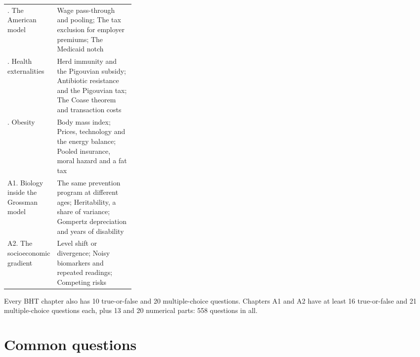\begin{center}
\begin{tabularx}{\linewidth}{@{}>{\raggedright\arraybackslash}p{0.30\linewidth} >{\raggedright\arraybackslash}X@{}}
\addlinespace
18. The American model & Wage pass-through and pooling; The tax exclusion for employer premiums; The Medicaid notch \\
\addlinespace
20. Health externalities & Herd immunity and the Pigouvian subsidy; Antibiotic resistance and the Pigouvian tax; The Coase theorem and transaction costs \\
\addlinespace
22. Obesity & Body mass index; Prices, technology and the energy balance; Pooled insurance, moral hazard and a fat tax \\
\addlinespace
A1. Biology inside the Grossman model & The same prevention program at different ages; Heritability, a share of variance; Gompertz depreciation and years of disability \\
\addlinespace
A2. The socioeconomic gradient & Level shift or divergence; Noisy biomarkers and repeated readings; Competing risks \\
\bottomrule
\end{tabularx}
\end{center}

Every BHT chapter also has 10 true-or-false and 20 multiple-choice questions. Chapters A1 and A2 have at least 16 true-or-false and 21 multiple-choice questions each, plus 13 and 20 numerical parts: 558 questions in all.

\section{Common questions}

